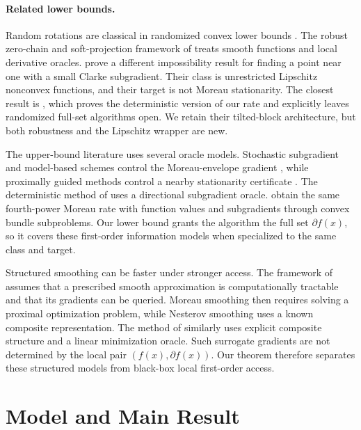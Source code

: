 \documentclass[twoside]{article}
\begin{document}
\paragraph{Related lower bounds.}
Random rotations are classical in randomized convex lower bounds \citep{woodworth2017randomized,diakonikolas2020parallel}. The robust zero-chain and soft-projection framework of \citet{carmon2020stationary} treats smooth functions and local derivative oracles. \citet{kornowski2022oracle} prove a different impossibility result for finding a point near one with a small Clarke subgradient. Their class is unrestricted Lipschitz nonconvex functions, and their target is not Moreau stationarity. The closest result is \citet{li2026deterministic}, which proves the deterministic version of our rate and explicitly leaves randomized full-set algorithms open. We retain their tilted-block architecture, but both robustness and the Lipschitz wrapper are new.

The upper-bound literature uses several oracle models. Stochastic subgradient and model-based schemes control the Moreau-envelope gradient \citep{davis2018stochastic,davis2019model}, while proximally guided methods control a nearby stationarity certificate \citep{davis2019guided}. The deterministic method of \citet{kong2024cost} uses a directional subgradient oracle. \citet{liao2025proximal} obtain the same fourth-power Moreau rate with function values and subgradients through convex bundle subproblems. Our lower bound grants the algorithm the full set $\partial f(x)$, so it covers these first-order information models when specialized to the same class and target.

Structured smoothing can be faster under stronger access. The framework of \citet{deng2026smooth} assumes that a prescribed smooth approximation is computationally tractable and that its gradients can be queried. Moreau smoothing then requires solving a proximal optimization problem, while Nesterov smoothing uses a known composite representation. The method of \citet{najar2026variable} similarly uses explicit composite structure and a linear minimization oracle. Such surrogate gradients are not determined by the local pair $(f(x),\partial f(x))$. Our theorem therefore separates these structured models from black-box local first-order access.

\section{Model and Main Result}
\label{sec:model}
\end{document}

